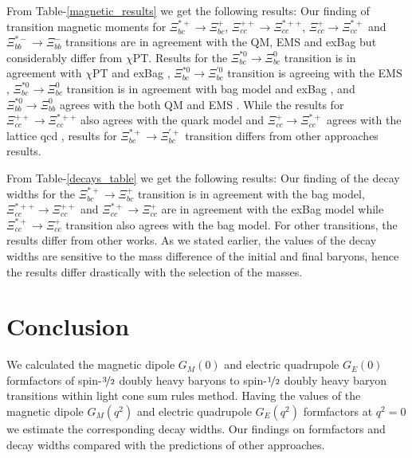 From Table-\ref{magnetic_results} we get the following results: Our finding of transition magnetic moments for $\Xi_{bc}^{\ast+}\rightarrow\Xi_{bc}^{+}$, $\Xi_{cc}^{++}\rightarrow\Xi_{cc}^{\ast++}$, $\Xi_{cc}^{+}\rightarrow\Xi_{cc}^{\ast+}$ and $\Xi_{bb}^{\ast-}\rightarrow\Xi_{bb}^{-}$ transitions are in agreement with the QM\cite{transition15}, EMS \cite{DhirEMS} and exBag \cite{exBag} but considerably differ from $\chi$PT\cite{transition15}. Results for the $\Xi_{bc}^{\ast0}\rightarrow\Xi_{bc}^{0}$ transition is in agreement with $\chi$PT \cite{transition15} and exBag \cite{exBag}, $\Xi_{bc}^{\ast0}\rightarrow\Xi_{bc}^{\prime0}$ transition is agreeing with the EMS \cite{DhirEMS}, $\Xi_{bc}^{\ast0}\rightarrow\Xi_{bc}^{0}$ transition is in agreement with bag model \cite{transition10} and exBag \cite{exBag}, and  $\Xi_{bb}^{\ast0}\rightarrow\Xi_{bb}^{0}$ agrees with the both QM \cite{transition15} and EMS \cite{DhirEMS}. While the results for $\Xi_{cc}^{++}\rightarrow\Xi_{cc}^{\ast++}$ also agrees with the quark model \cite{transition15} and $\Xi_{cc}^{+}\rightarrow\Xi_{cc}^{\ast+}$ agrees with the lattice qcd \cite{lattice}, results for $\Xi_{bc}^{\ast+}\rightarrow\Xi_{bc}^{\prime+}$ transition differs from other approaches results.

From Table-\ref{decays_table} we get the following results: Our finding of the decay widths for the $\Xi_{bc}^{\ast+}\rightarrow\Xi_{bc}^{+}$ transition is in agreement with the bag model\cite{transition10}, $\Xi_{cc}^{\ast++}\rightarrow\Xi_{cc}^{++}$ and $\Xi_{cc}^{\ast+}\rightarrow\Xi_{cc}^{+}$ are in agreement with the exBag model\cite{exBag} while $\Xi_{cc}^{\ast+}\rightarrow\Xi_{cc}^{+}$ transition also agrees with the bag model\cite{transition10}. For other transitions, the results differ from other works. As we stated earlier, the values of the decay widths are sensitive to the mass difference of the initial and final baryons, hence the results differ drastically with the selection of the masses.



\section{Conclusion}

We calculated the magnetic dipole $G_M(0)$ and electric quadrupole $G_E(0)$ formfactors of spin-$\nicefrac{3}{2}$ doubly heavy baryons to spin-$\nicefrac{1}{2}$ doubly heavy baryon transitions within light cone sum rules method. Having the values of the magnetic dipole $G_M(q^2)$ and electric quadrupole $G_E(q^2)$ formfactors at $q^2=0$ we estimate the corresponding decay widths. Our findings on formfactors and decay widths compared with the predictions of other approaches.   